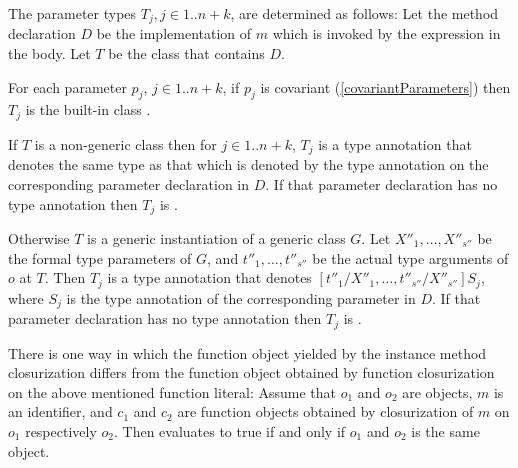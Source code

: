 \documentclass[makeidx]{article}
\begin{document}
{

\LMHash{}%
The parameter types $T_j, j \in 1 .. n+k$, are determined as follows:
Let the method declaration $D$ be the implementation of $m$
which is invoked by the expression in the body.
Let $T$ be the class that contains $D$.


\LMHash{}%
For each parameter $p_j$, $j \in 1 .. n+k$, if $p_j$ is covariant
(\ref{covariantParameters})
then $T_j$ is the built-in class .


\LMHash{}%
If $T$ is a non-generic class then for $j \in 1 .. n+k$,
$T_j$ is a type annotation that denotes the same type as that
which is denoted by the type annotation on
the corresponding parameter declaration in $D$.
If that parameter declaration has no type annotation then $T_j$ is \DYNAMIC.

\LMHash{}%
Otherwise $T$ is a generic instantiation of a generic class $G$.
Let $X''_1, \ldots, X''_{s''}$ be the formal type parameters of $G$,
and $t''_1, \ldots, t''_{s''}$ be the actual type arguments of $o$ at $T$.
Then $T_j$ is a type annotation that denotes
$[t''_1/X''_1, \ldots, t''_{s''}/X''_{s''}]S_j$,
where $S_j$ is the type annotation of the corresponding parameter in $D$.
If that parameter declaration has no type annotation then $T_j$ is \DYNAMIC.

\LMHash{}%
There is one way in which
the function object yielded by the instance method closurization differs from
the function object obtained by function closurization on
the above mentioned function literal:
Assume that $o_1$ and $o_2$ are objects, $m$ is an identifier,
and $c_1$ and $c_2$ are function objects
obtained by closurization of $m$ on $o_1$ respectively $o_2$.
Then  evaluates to true
if and only if $o_1$ and $o_2$ is the same object.


}
\end{document}

